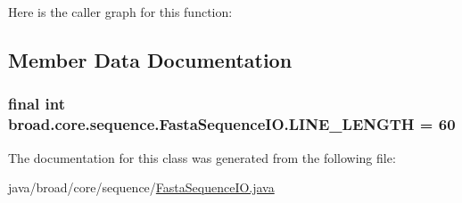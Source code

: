 Here is the caller graph for this function\+:




\subsection{Member Data Documentation}
\hypertarget{classbroad_1_1core_1_1sequence_1_1_fasta_sequence_i_o_a9fd2a01250cf7c4adeda3bb321c0df44}{
\subsubsection[{L\+I\+N\+E\+\_\+\+L\+E\+N\+G\+T\+H}]{\setlength{\rightskip}{0pt plus 5cm}final int broad.\+core.\+sequence.\+Fasta\+Sequence\+I\+O.\+L\+I\+N\+E\+\_\+\+L\+E\+N\+G\+T\+H = 60\hspace{0.3cm}{\ttfamily [static]}}}\label{classbroad_1_1core_1_1sequence_1_1_fasta_sequence_i_o_a9fd2a01250cf7c4adeda3bb321c0df44}


The documentation for this class was generated from the following file\+:\begin{DoxyCompactItemize}
\item 
java/broad/core/sequence/\hyperlink{_fasta_sequence_i_o_8java}{Fasta\+Sequence\+I\+O.\+java}\end{DoxyCompactItemize}
